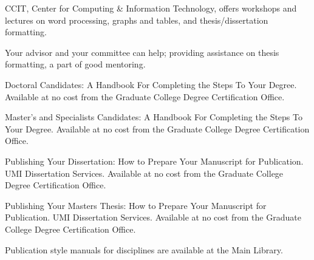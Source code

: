 \documentclass[draft]{ua-thesis}
\begin{document}
\begin{thebibliography}{9}

CCIT, Center for Computing \& Information Technology, offers workshops and
lectures on word processing, graphs and tables, and thesis/dissertation
formatting.

Your advisor and your committee can help; providing assistance on thesis
formatting, a part of good mentoring.

Doctoral Candidates: A Handbook For Completing the Steps To Your Degree.
Available at no cost from the Graduate College Degree Certification Office.

Master's and Specialists Candidates: A Handbook For Completing the Steps To
Your Degree. Available at no cost from the Graduate College Degree
Certification Office.

Publishing Your Dissertation: How to Prepare Your Manuscript for
Publication. UMI Dissertation Services. Available at no cost from the
Graduate College Degree Certification Office.

Publishing Your Masters Thesis: How to Prepare Your Manuscript for
Publication. UMI Dissertation Services. Available at no cost from the
Graduate College Degree Certification Office.

Publication style manuals for disciplines are available at the Main Library.

\end{thebibliography}
\end{document}
